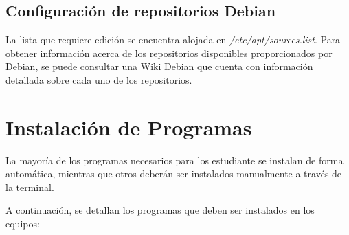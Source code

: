 		\subsection{Configuración de repositorios Debian}
		
		La lista que requiere edición se encuentra alojada en \textit{/etc/apt/sources.list}. Para obtener información acerca de los repositorios disponibles proporcionados por \href{https://www.debian.org}{\color{blue}{}Debian}, se puede consultar una \href{https://wiki.debian.org/SourcesList/}{\color{blue}{}Wiki Debian} que cuenta con información detallada sobre cada uno de los repositorios.\par
		
	
			
	\section{Instalación de Programas}
		
		La mayoría de los programas necesarios para los estudiante se instalan de forma automática, mientras que otros deberán ser instalados manualmente a través de la terminal.\par

		A continuación, se detallan los programas que deben ser instalados en los equipos:
		
